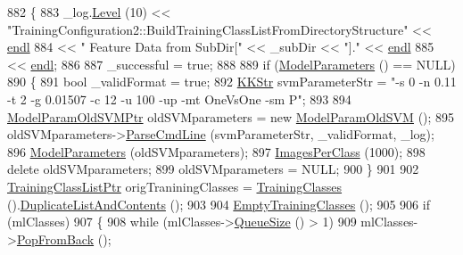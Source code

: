 \begin{DoxyCode}
882 \{
883   \_log.\hyperlink{class_k_k_b_1_1_run_log_a32cf761d7f2e747465fd80533fdbb659}{Level} (10) << \textcolor{stringliteral}{"TrainingConfiguration2::BuildTrainingClassListFromDirectoryStructure"}  << 
      \hyperlink{namespace_k_k_b_ad1f50f65af6adc8fa9e6f62d007818a8}{endl}
884                   << \textcolor{stringliteral}{"                       Feature Data from SubDir["} << \_subDir << \textcolor{stringliteral}{"]."} << 
      \hyperlink{namespace_k_k_b_ad1f50f65af6adc8fa9e6f62d007818a8}{endl}
885                   << \hyperlink{namespace_k_k_b_ad1f50f65af6adc8fa9e6f62d007818a8}{endl};
886 
887   \_successful = \textcolor{keyword}{true};
888 
889   \textcolor{keywordflow}{if}  (\hyperlink{class_k_k_m_l_l_1_1_training_configuration2_a5087f98915a824279a251734d5ed0982}{ModelParameters} () == NULL)
890   \{
891     \textcolor{keywordtype}{bool}  \_validFormat = \textcolor{keyword}{true};
892     \hyperlink{class_k_k_b_1_1_k_k_str}{KKStr}  svmParameterStr = \textcolor{stringliteral}{"-s 0 -n 0.11 -t 2 -g 0.01507  -c 12  -u 100  -up  -mt OneVsOne  -sm P"};
893 
894     \hyperlink{class_k_k_m_l_l_1_1_model_param_old_s_v_m}{ModelParamOldSVMPtr}  oldSVMparameters = \textcolor{keyword}{new} 
      \hyperlink{class_k_k_m_l_l_1_1_model_param_old_s_v_m}{ModelParamOldSVM} ();
895     oldSVMparameters->\hyperlink{class_k_k_m_l_l_1_1_model_param_old_s_v_m_a730e73f251b652a0daecb146c761065d}{ParseCmdLine} (svmParameterStr, \_validFormat, \_log);
896     \hyperlink{class_k_k_m_l_l_1_1_training_configuration2_a5087f98915a824279a251734d5ed0982}{ModelParameters} (oldSVMparameters);
897     \hyperlink{class_k_k_m_l_l_1_1_training_configuration2_a0601497691c99932c183fdc963f893f0}{ImagesPerClass} (1000);
898     \textcolor{keyword}{delete}  oldSVMparameters;
899     oldSVMparameters = NULL;
900   \}
901   
902   \hyperlink{class_k_k_m_l_l_1_1_training_class_list}{TrainingClassListPtr}  origTraniningClasses = 
      \hyperlink{class_k_k_m_l_l_1_1_training_configuration2_a450845cc4aaf5e9e88fb60bdd6a528bf}{TrainingClasses} ().\hyperlink{class_k_k_m_l_l_1_1_training_class_list_a736627853cd187aced3dd01b37c0e1a4}{DuplicateListAndContents} ();
903 
904   \hyperlink{class_k_k_m_l_l_1_1_training_configuration2_aa90043c22d4bcbffc4a75a1d55bac942}{EmptyTrainingClasses} ();
905   
906   \textcolor{keywordflow}{if}  (mlClasses)
907   \{
908     \textcolor{keywordflow}{while}  (mlClasses->\hyperlink{class_k_k_b_1_1_k_k_queue_a1dab601f75ee6a65d97f02bddf71c40d}{QueueSize} () > 1)
909       mlClasses->\hyperlink{class_k_k_m_l_l_1_1_m_l_class_list_add4473f4d1f638b7c9e71506401657a4}{PopFromBack} ();

\end{DoxyCode}
